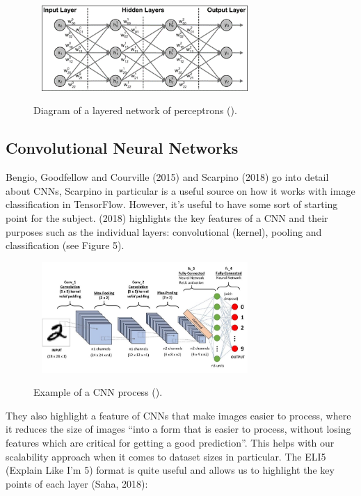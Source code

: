 \documentclass{article}
\begin{document}
\begin{figure}[h]\
    \centering
    \includegraphics[width=0.7\textwidth]{network.png}
    \caption{Diagram of a layered network of perceptrons (\cite{ScarpinoMatthew2018Tfd}).}
\end{figure}

\subsection{Convolutional Neural Networks}
\label{subsec:cnn}

Bengio, Goodfellow and Courville (2015) and Scarpino (2018) go into detail about CNNs, Scarpino in particular is a
useful source on how it works with image classification in TensorFlow. However, it's useful to have 
some sort of starting point for the subject. \citeauthor{saha2018} (2018) highlights the key features of a CNN and their
purposes such as the individual layers: convolutional (kernel),  pooling and classification (see Figure 5).

\begin{figure}[h]\
    \centering
    \includegraphics[width=0.7\textwidth]{saha.jpg}
    \caption{Example of a CNN process (\cite{saha2018}).}
    \label{fig:cnnSimple}
\end{figure}
\break

They also highlight a feature of CNNs that make images easier to process, where it reduces the size of images “into a 
form that is easier to process, without losing features which are critical for getting a good prediction”. This helps 
with our scalability approach when it comes to dataset sizes in particular. The ELI5 (Explain Like I'm 5) format is 
quite useful and allows us to highlight the key points of each layer (Saha, 2018):
\end{document}
